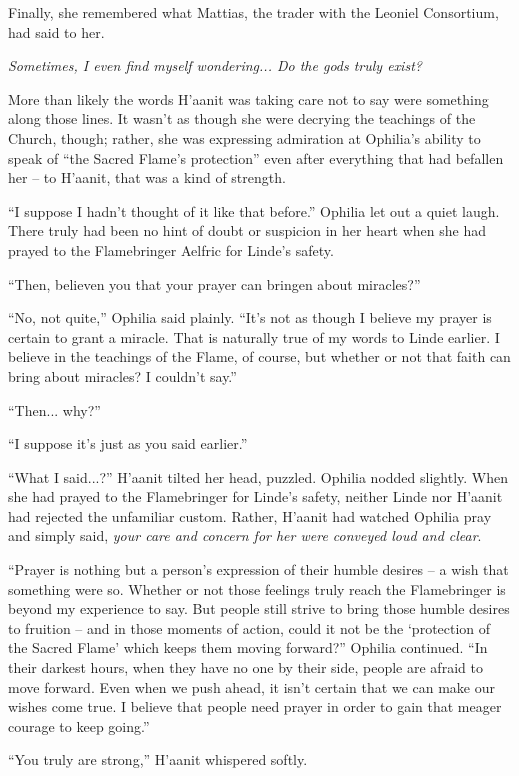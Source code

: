 Finally, she remembered what Mattias, the trader with the Leoniel Consortium, had said to her.

\emph{Sometimes, I even find myself wondering... Do the gods truly exist?}

More than likely the words H'aanit was taking care not to say were something along those lines. It wasn't as though she were decrying the teachings of the Church, though; rather, she was expressing admiration at Ophilia's ability to speak of ``the Sacred Flame's protection'' even after everything that had befallen her -- to H'aanit, that was a kind of strength. 

``I suppose I hadn't thought of it like that before.'' Ophilia let out a quiet laugh. There truly had been no hint of doubt or suspicion in her heart when she had prayed to the Flamebringer Aelfric for Linde's safety.

``Then, believen you that your prayer can bringen about miracles?''

``No, not quite,'' Ophilia said plainly. ``It's not as though I believe my prayer is certain to grant a miracle. That is naturally true of my words to Linde earlier. I believe in the teachings of the Flame, of course, but whether or not that faith can bring about miracles? I couldn't say.''

``Then... why?''

``I suppose it's just as you said earlier.''

``What I said...?'' H'aanit tilted her head, puzzled. Ophilia nodded slightly. When she had prayed to the Flamebringer for Linde's safety, neither Linde nor H'aanit had rejected the unfamiliar custom. Rather, H'aanit had watched Ophilia pray and simply said, \emph{your care and concern for her were conveyed loud and clear}.

``Prayer is nothing but a person's expression of their humble desires -- a wish that something were so. Whether or not those feelings truly reach the Flamebringer is beyond my experience to say. But people still strive to bring those humble desires to fruition -- and in those moments of action, could it not be the `protection of the Sacred Flame' which keeps them moving forward?'' Ophilia continued. ``In their darkest hours, when they have no one by their side, people are afraid to move forward. Even when we push ahead, it isn't certain that we can make our wishes come true. I believe that people need prayer in order to gain that meager courage to keep going.''

``You truly are strong,'' H'aanit whispered softly.

